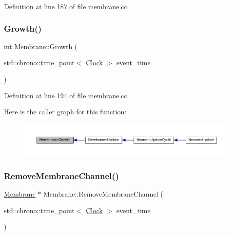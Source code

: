 Definition at line 187 of file membrane.\+cc.

\mbox{\label{class_membrane_a544742864485b9ac052f3b241ae5c6b4}} 
\subsubsection{\texorpdfstring{Growth()}{Growth()}}
{\footnotesize\ttfamily int Membrane\+::\+Growth (\begin{DoxyParamCaption}\item[{std\+::chrono\+::time\+\_\+point$<$ \mbox{\hyperlink{universe_8h_a0ef8d951d1ca5ab3cfaf7ab4c7a6fd80}{Clock}} $>$}]{event\+\_\+time }\end{DoxyParamCaption})}



Definition at line 194 of file membrane.\+cc.

Here is the caller graph for this function\+:\nopagebreak
\begin{figure}[H]
\begin{center}
\leavevmode
\includegraphics[width=350pt]{class_membrane_a544742864485b9ac052f3b241ae5c6b4_icgraph}
\end{center}
\end{figure}
\mbox{\label{class_membrane_a36d6927c8869cc752b55623dac661107}} 
\subsubsection{\texorpdfstring{Remove\+Membrane\+Channel()}{RemoveMembraneChannel()}}
{\footnotesize\ttfamily \mbox{\hyperlink{class_membrane}{Membrane}} $\ast$ Membrane\+::\+Remove\+Membrane\+Channel (\begin{DoxyParamCaption}\item[{std\+::chrono\+::time\+\_\+point$<$ \mbox{\hyperlink{universe_8h_a0ef8d951d1ca5ab3cfaf7ab4c7a6fd80}{Clock}} $>$}]{event\+\_\+time }\end{DoxyParamCaption})}



